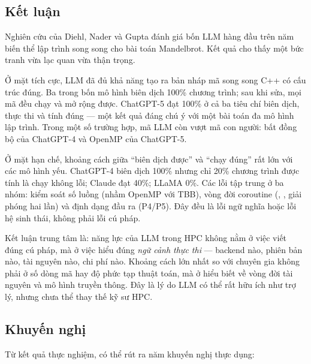 \label{sec:ketluan}

\subsection{Kết luận}

Nghiên cứu của Diehl, Nader và Gupta đánh giá bốn LLM hàng đầu trên năm biến thể
lập trình song song cho bài toán Mandelbrot. Kết quả cho thấy một bức tranh vừa
lạc quan vừa thận trọng.

Ở mặt tích cực, LLM đã đủ khả năng tạo ra bản nháp mã song song C++ có cấu trúc
đúng. Ba trong bốn mô hình biên dịch 100\% chương trình; sau khi sửa, mọi mã đều
chạy và mở rộng được. ChatGPT-5 đạt 100\% ở cả ba tiêu chí biên dịch, thực thi và
tính đúng — một kết quả đáng chú ý với một bài toán đa mô hình lập trình. Trong
một số trường hợp, mã LLM còn vượt mã con người: bất đồng bộ của ChatGPT-4 và
OpenMP của ChatGPT-5.

Ở mặt hạn chế, khoảng cách giữa “biên dịch được” và “chạy đúng” rất lớn với các
mô hình yếu. ChatGPT-4 biên dịch 100\% nhưng chỉ 20\% chương trình được tính là
chạy không lỗi; Claude đạt 40\%; LLaMA 0\%. Các lỗi tập trung ở ba nhóm: kiểm
soát số luồng (nhầm OpenMP với TBB), vòng đời coroutine (,
, giải phóng hai lần) và định dạng đầu ra (P4/P5). Đây đều là
lỗi ngữ nghĩa hoặc lỗi hệ sinh thái, không phải lỗi cú pháp.

Kết luận trung tâm là: năng lực của LLM trong HPC không nằm ở việc viết đúng cú
pháp, mà ở việc hiểu đúng \emph{ngữ cảnh thực thi} — backend nào, phiên bản nào,
tài nguyên nào, chi phí nào. Khoảng cách lớn nhất so với chuyên gia không phải ở
số dòng mã hay độ phức tạp thuật toán, mà ở hiểu biết về vòng đời tài nguyên và
mô hình truyền thông. Đây là lý do LLM có thể rất hữu ích như trợ lý, nhưng chưa
thể thay thế kỹ sư HPC.

\subsection{Khuyến nghị}

Từ kết quả thực nghiệm, có thể rút ra năm khuyến nghị thực dụng:

